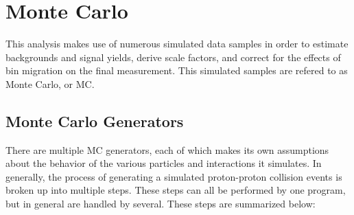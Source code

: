 \section{Monte Carlo}
\label{sec:mc}

This analysis makes use of numerous simulated data samples in order to estimate
backgrounds and signal yields, derive scale factors, and correct for the
effects of bin migration on the final measurement. This simulated samples are
refered to as Monte Carlo, or MC.

\subsection{Monte Carlo Generators}
\label{ssec:mc_generators}

There are multiple MC generators, each of which makes its own assumptions about
the behavior of the various particles and interactions it simulates. In
generally, the process of generating a simulated proton-proton collision
events is broken up into multiple steps. These steps can all be performed by one
program, but in general are handled by several. These steps are summarized
below:

